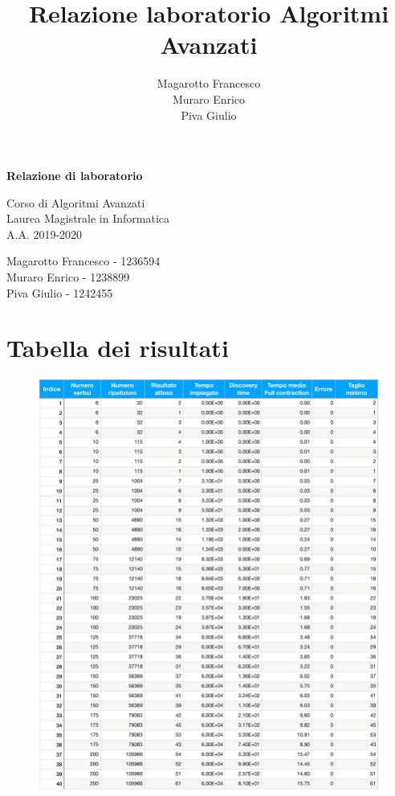 \documentclass[a4paper]{article}
\title{Relazione laboratorio Algoritmi Avanzati}
\author{Magarotto Francesco\\Muraro Enrico\\Piva Giulio}
\begin{document}
\begin{titlepage}
  \vspace*{5cm}
  \begin{center}
    \Large\bfseries
    Relazione di laboratorio
  \end{center}
  \begin{center}
    \large
    Corso di Algoritmi Avanzati\\
    Laurea Magistrale in Informatica\\A.A. 2019-2020
  \end{center}
  \vspace{4cm plus 1fill}
  \begin{flushleft}
    \large
    Magarotto Francesco - 1236594\\Muraro Enrico - 1238899 \\Piva Giulio - 1242455
  \end{flushleft}
\end{titlepage}
\newpage



\section{Tabella dei risultati}
\begin{figure}[H]
	\centering
	\includegraphics[width=17cm]{tabellapdf}
	\label{fig:tabellapdf}
\end{figure}
\end{document}
